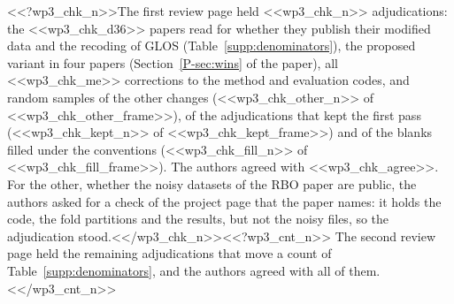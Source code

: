 <<?wp3_chk_n>>The first review page held <<wp3_chk_n>> adjudications: the <<wp3_chk_d36>> papers read for whether they publish their modified data and the recoding of GLOS (Table~\ref{supp:denominators}), the proposed variant in four papers (Section~\ref*{P-sec:wins} of the paper), all <<wp3_chk_me>> corrections to the method and evaluation codes, and random samples of the other changes (<<wp3_chk_other_n>> of <<wp3_chk_other_frame>>), of the adjudications that kept the first pass (<<wp3_chk_kept_n>> of <<wp3_chk_kept_frame>>) and of the blanks filled under the conventions (<<wp3_chk_fill_n>> of <<wp3_chk_fill_frame>>). The authors agreed with <<wp3_chk_agree>>. For the other, whether the noisy datasets of the RBO paper \citep{koziarski2019rbo} are public, the authors asked for a check of the project page that the paper names: it holds the code, the fold partitions and the results, but not the noisy files, so the adjudication stood.<</wp3_chk_n>><<?wp3_cnt_n>> The second review page held the remaining adjudications that move a count of Table~\ref{supp:denominators}, and the authors agreed with all of them.<</wp3_cnt_n>>
